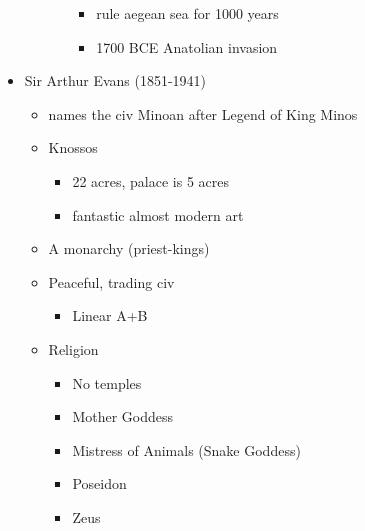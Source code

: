 \documentclass[11pt, a4paper]{article}
\begin{document}
\begin{itemize}
\begin{itemize}
\begin{itemize}
            \begin{itemize}
              \item rule aegean sea for 1000 years
              \item 1700 BCE Anatolian invasion
            \end{itemize}
        \end{itemize}
    \end{itemize}
  \item Sir Arthur Evans (1851-1941)
    \begin{itemize}
      \item names the civ Minoan after Legend of King Minos
      \item Knossos
        \begin{itemize}
          \item 22 acres, palace is 5 acres
          \item fantastic almost modern art
        \end{itemize}
      \item A monarchy (priest-kings)
      \item Peaceful, trading civ
        \begin{itemize}
          \item Linear A+B
        \end{itemize}
      \item Religion
        \begin{itemize}
          \item No temples
          \item Mother Goddess
          \item Mistress of Animals (Snake Goddess)
          \item Poseidon
          \item Zeus
        \end{itemize}
    \end{itemize}

\end{itemize}
\end{document}
